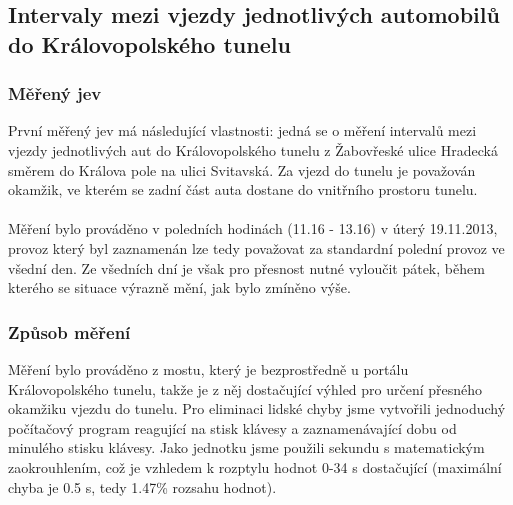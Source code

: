 \documentclass[11pt,a4paper]{article}
\begin{document}
	\subsection{Intervaly mezi vjezdy jednotlivých automobilů do Královopolského tunelu}
		\subsubsection{Měřený jev}
		První měřený jev má následující vlastnosti: jedná se o měření intervalů mezi vjezdy
		jednotlivých aut do Královopolského tunelu z Žabovřeské ulice Hradecká směrem do Králova pole
		na ulici Svitavská. Za vjezd do tunelu je považován okamžik, ve kterém se zadní část
		auta dostane do vnitřního prostoru tunelu. \\ \\

		Měření bylo prováděno v poledních hodinách (11.16 - 13.16) v úterý 19.11.2013, provoz který byl
		zaznamenán lze tedy považovat za standardní polední provoz ve všední den. Ze všedních dní je však 
		pro přesnost nutné vyloučit pátek, během kterého se situace výrazně mění, jak bylo zmíněno výše.

		\subsubsection{Způsob měření}
		Měření bylo prováděno z mostu, který je bezprostředně u portálu Královopolského tunelu, takže je z 
		něj dostačující výhled pro určení přesného okamžiku vjezdu do tunelu. Pro eliminaci lidské chyby 
		jsme vytvořili jednoduchý počítačový program reagující na stisk klávesy a zaznamenávající dobu od
		minulého stisku klávesy. Jako jednotku jsme použili sekundu s matematickým zaokrouhlením, což je 
		vzhledem k rozptylu hodnot 0-34 s dostačující (maximální chyba je 0.5 s, tedy 1.47\% rozsahu hodnot).
\end{document}
